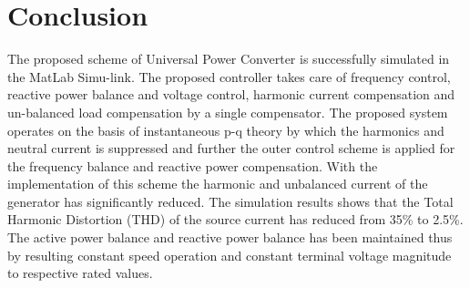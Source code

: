 \documentclass[journal,twoside]{IEEEtran}
\begin{document}
\section{Conclusion}

The proposed scheme of Universal Power Converter is
successfully simulated in the MatLab Simu-link. The
proposed controller takes care of frequency control, reactive
power balance and voltage control, harmonic current
compensation and un-balanced load compensation by a
single compensator. The proposed system operates on the
basis of instantaneous p-q theory by which the harmonics
and neutral current is suppressed and further the outer
control scheme is applied for the frequency balance and
reactive power compensation. With the implementation of
this scheme the harmonic and unbalanced current of the
generator has significantly reduced. The simulation results
shows that the Total Harmonic Distortion (THD) of the
source current has reduced from 35\% to 2.5\%. The active
power balance and reactive power balance has been
maintained thus by resulting constant speed operation and
constant terminal voltage magnitude to respective rated
values.
\end{document}
